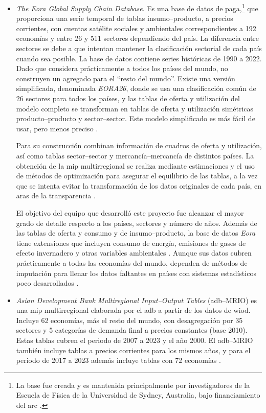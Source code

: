 \begin{itemize}
 \item \textit{The Eora Global Supply Chain Database}. Es una base de datos de paga,\footnote{La base fue creada y es mantenida principalmente por investigadores de la Escuela de Física de la Universidad de Sydney, Australia, bajo financiamiento del \gls{arc} \cite[p.~103]{Miller2022}.} que proporciona una serie temporal de tablas insumo--producto, a precios corrientes, con cuentas satélite sociales y ambientales correspondientes a 192 economías y entre 26 y 511 sectores dependiendo del país.  La diferencia entre sectores se debe a que intentan mantener la clasificación sectorial de cada país cuando sea posible. La base de datos contiene series históricas de 1990 a 2022. Dado que considera prácticamente a todos los países del mundo, no construyen un agregado para el ``resto del mundo''. Existe una versión simplificada, denominada \textit{EORA26}, donde se usa una clasificación común de 26 sectores para todos los países, y las tablas de oferta y utilización del modelo completo se transforman en tablas de oferta y utilización simétricas producto--producto y sector--sector. Este modelo simplificado es más fácil de usar, pero menos preciso \parencite{EORA}. 

 Para su construcción combinan información de cuadros de oferta y utilización, así como tablas sector--sector y mercancía--mercancía de distintos países. La obtención de la \gls{mip} multirregional se realiza mediante estimaciones y el uso de métodos de optimización para asegurar el equilibrio de las tablas, a la vez que se intenta evitar la transformación de los datos originales de cada país, en aras de la transparencia
 \parencite{Lenzen2012, Lenzen2013}.
 

El objetivo del equipo que desarrolló este proyecto fue alcanzar el mayor grado de detalle respecto a los países, sectores y número de años. Además de las tablas de oferta y consumo y de insumo--producto, la base de datos \textit{Eora} tiene extensiones que incluyen consumo de energía, emisiones de gases de efecto invernadero y otras variables ambientales \parencite{Wiedmann2011}. Aunque sus datos cubren prácticamente a todas las economías del mundo, dependen de métodos de imputación para llenar los datos faltantes en países con sistemas estadísticos poco desarrollados \parencite[p.~579]{Timmer2015}.%
 
 \item \textit{Asian Development Bank Multiregional Input--Output Tables} (\acrshort{adb}--MRIO) es una \gls{mip} multirregional elaborada por el \gls{adb} a partir de los datos de \gls{wiod}. Incluye 62 economías, más el resto del mundo, con desagregación por 35 sectores y 5 categorías de demanda final a precios constantes (base 2010). Estas tablas cubren el periodo de 2007 a 2023 y el año 2000. El \acrshort{adb}--MRIO también incluye tablas a precios corrientes para los mismos años, y para el periodo de 2017 a 2023 además incluye tablas con 72 economías \parencite{ABD}.
 

\end{itemize}
